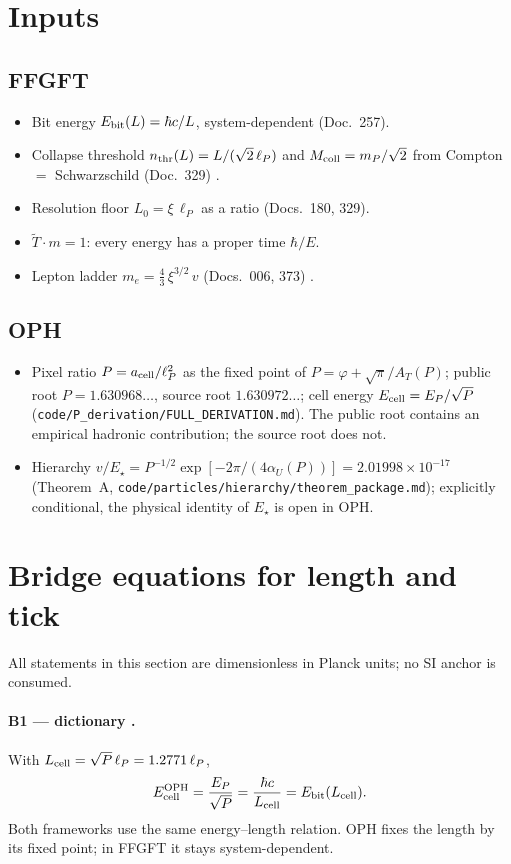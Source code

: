 \section{Inputs}

\subsection*{FFGFT}
\begin{itemize}\itemsep2pt
\item Bit energy $E_{\rm bit}(L)=\hbar c/L$, system-dependent (Doc.~257).
\item Collapse threshold $n_{\rm thr}(L)=L/(\sqrt2\,\ell_P)$ and
  $M_{\rm coll}=m_P/\sqrt2$ from Compton $=$ Schwarzschild (Doc.~329) \BM.
\item Resolution floor $L_0=\xi\,\ell_P$ as a ratio (Docs.~180, 329).
\item $\tilde T\cdot m=1$: every energy has a proper time $\hbar/E$.
\item Lepton ladder $m_e=\tfrac43\,\xi^{3/2}\,v$ (Docs.~006, 373) \KM.
\end{itemize}

\subsection*{OPH \QM}
\begin{itemize}\itemsep2pt
\item Pixel ratio $P=a_{\rm cell}/\ell_P^2$ as the fixed point of
  $P=\varphi+\sqrt\pi/A_T(P)$; public root $P=1.630968\ldots$, source root
  $1.630972\ldots$; cell energy $E_{\rm cell}=E_P/\sqrt P$
  (\texttt{code/P\_derivation/FULL\_DERIVATION.md}). The public root contains
  an empirical hadronic contribution; the source root does not.
\item Hierarchy $v/E_\star=P^{-1/2}\exp[-2\pi/(4\alpha_U(P))]
  =2.01998\times10^{-17}$ (Theorem~A,
  \texttt{code/particles/hierarchy/theorem\_package.md}); explicitly
  conditional, the physical identity of $E_\star$ is open in OPH.
\end{itemize}

\section{Bridge equations for length and tick}\label{sec:bruecke}

All statements in this section are dimensionless in Planck units; no SI anchor
is consumed.

\paragraph{B1 --- dictionary \BM.} With $L_{\rm cell}=\sqrt P\,\ell_P=1.2771\,\ell_P$,
\begin{equation}
  E_{\rm cell}^{\rm OPH}=\frac{E_P}{\sqrt P}=\frac{\hbar c}{L_{\rm cell}}=E_{\rm bit}(L_{\rm cell}).
\end{equation}
Both frameworks use the same energy--length relation. OPH fixes the length by
its fixed point; in FFGFT it stays system-dependent.

